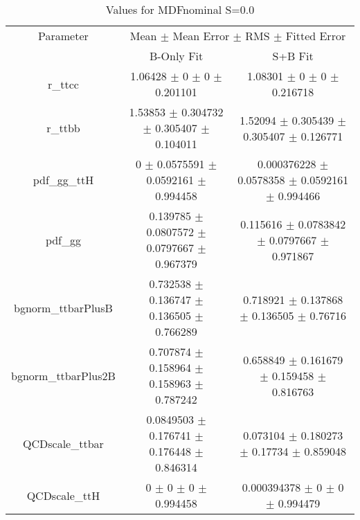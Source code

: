 \begin{table}
\centering
\caption{Values for MDFnominal S=0.0}
\begin{tabular}{ccc}
\toprule
Parameter & \multicolumn{2}{c}{Mean $\pm$ Mean Error $\pm$ RMS $\pm$ Fitted Error}\\
 & B-Only Fit & S+B Fit\\
\midrule
r\_ttcc & \num{1.06428} $\pm$ \num{0} $\pm$ \num{0} $\pm$ \num{0.201101} & \num{1.08301} $\pm$ \num{0} $\pm$ \num{0} $\pm$ \num{0.216718}\\
r\_ttbb & \num{1.53853} $\pm$ \num{0.304732} $\pm$ \num{0.305407} $\pm$ \num{0.104011} & \num{1.52094} $\pm$ \num{0.305439} $\pm$ \num{0.305407} $\pm$ \num{0.126771}\\
pdf\_gg\_ttH & \num{0} $\pm$ \num{0.0575591} $\pm$ \num{0.0592161} $\pm$ \num{0.994458} & \num{0.000376228} $\pm$ \num{0.0578358} $\pm$ \num{0.0592161} $\pm$ \num{0.994466}\\
pdf\_gg & \num{0.139785} $\pm$ \num{0.0807572} $\pm$ \num{0.0797667} $\pm$ \num{0.967379} & \num{0.115616} $\pm$ \num{0.0783842} $\pm$ \num{0.0797667} $\pm$ \num{0.971867}\\
bgnorm\_ttbarPlusB & \num{0.732538} $\pm$ \num{0.136747} $\pm$ \num{0.136505} $\pm$ \num{0.766289} & \num{0.718921} $\pm$ \num{0.137868} $\pm$ \num{0.136505} $\pm$ \num{0.76716}\\
bgnorm\_ttbarPlus2B & \num{0.707874} $\pm$ \num{0.158964} $\pm$ \num{0.158963} $\pm$ \num{0.787242} & \num{0.658849} $\pm$ \num{0.161679} $\pm$ \num{0.159458} $\pm$ \num{0.816763}\\
QCDscale\_ttbar & \num{0.0849503} $\pm$ \num{0.176741} $\pm$ \num{0.176448} $\pm$ \num{0.846314} & \num{0.073104} $\pm$ \num{0.180273} $\pm$ \num{0.17734} $\pm$ \num{0.859048}\\
QCDscale\_ttH & \num{0} $\pm$ \num{0} $\pm$ \num{0} $\pm$ \num{0.994458} & \num{0.000394378} $\pm$ \num{0} $\pm$ \num{0} $\pm$ \num{0.994479}\\
\bottomrule
\end{tabular}
\end{table}